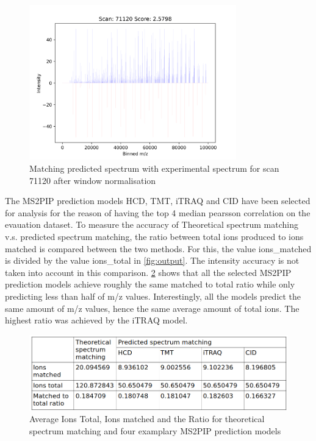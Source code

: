 \documentclass[11pt]{article}
\begin{document}
\begin{figure}[ht]
\centering
\includegraphics[width=0.8\textwidth]{figs/scan_71120_ps=True_wins.png}
\caption{Matching predicted spectrum with experimental spectrum for scan 71120 after window normalisation}
\label{fig:scanwin}
\end{figure}

The MS2PIP prediction models HCD, TMT, iTRAQ and CID have been selected for analysis for the reason of having the top 4 median pearsson correlation on the evauation dataset.
To measure the accuracy of Theoretical spectrum matching v.s. predicted spectrum matching, the ratio between total ions produced to ions matched is compared between the two methods. For this, the value ions\_matched is divided by the value ions\_total in \cref{fig:output}. The intensity accuracy is not taken into account in this comparison. \cref{fig:ratio_table} shows that all the selected MS2PIP prediction models achieve roughly the same matched to total ratio while only predicting less than half of m/z values. Interestingly, all the models predict the same amount of m/z values, hence the same average amount of total ions. The highest ratio was achieved by the iTRAQ model.

\begin{figure}[ht]
\centering
\includegraphics[width=1\textwidth]{figs/ratio_table.png}
\caption{Average Ions Total, Ions matched and the Ratio for theoretical spectrum matching and four examplary MS2PIP prediction models}
\label{fig:ratio_table}
\end{figure}
\end{document}
